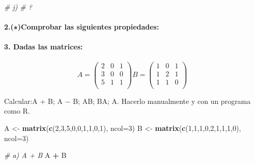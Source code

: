 \documentclass[]{article}
\newenvironment{Shaded}{\begin{snugshade}}{\end{snugshade}}
\newcommand{\CommentTok}[1]{\textcolor[rgb]{0.56,0.35,0.01}{\textit{#1}}}
\newcommand{\DataTypeTok}[1]{\textcolor[rgb]{0.13,0.29,0.53}{#1}}
\newcommand{\DecValTok}[1]{\textcolor[rgb]{0.00,0.00,0.81}{#1}}
\newcommand{\KeywordTok}[1]{\textcolor[rgb]{0.13,0.29,0.53}{\textbf{#1}}}
\newcommand{\NormalTok}[1]{#1}
\newcommand{\OperatorTok}[1]{\textcolor[rgb]{0.81,0.36,0.00}{\textbf{#1}}}
\newcommand{\StringTok}[1]{\textcolor[rgb]{0.31,0.60,0.02}{#1}}
\let\oldparagraph\paragraph
\renewcommand{\paragraph}[1]{\oldparagraph{#1}\mbox{}}
\begin{document}
\begin{Shaded}
\begin{Highlighting}[]
\CommentTok{# j)}
\CommentTok{# ?}
\end{Highlighting}
\end{Shaded}

\hypertarget{comprobar-las-siguientes-propiedades}{%
\paragraph{2.(∗)Comprobar las siguientes
propiedades:}\label{comprobar-las-siguientes-propiedades}}

\hypertarget{dadas-las-matrices}{%
\paragraph{3. Dadas las matrices:}\label{dadas-las-matrices}}

\[A = \begin{pmatrix}
2 & 0 & 1 \\
3 & 0 & 0 \\
5 & 1 & 1\\
\end{pmatrix}
B =  \begin{pmatrix}
1 & 0 & 1 \\
1 & 2 & 1 \\
1 & 1 & 0\\
\end{pmatrix}
\]

Calcular:A + B; A − B; AB; BA; A. Hacerlo manualmente y con un programa
como R.

\begin{Shaded}
\begin{Highlighting}[]
\NormalTok{A <-}\StringTok{ }\KeywordTok{matrix}\NormalTok{(}\KeywordTok{c}\NormalTok{(}\DecValTok{2}\NormalTok{,}\DecValTok{3}\NormalTok{,}\DecValTok{5}\NormalTok{,}\DecValTok{0}\NormalTok{,}\DecValTok{0}\NormalTok{,}\DecValTok{1}\NormalTok{,}\DecValTok{1}\NormalTok{,}\DecValTok{0}\NormalTok{,}\DecValTok{1}\NormalTok{), }\DataTypeTok{ncol=}\DecValTok{3}\NormalTok{)}
\NormalTok{B <-}\StringTok{ }\KeywordTok{matrix}\NormalTok{(}\KeywordTok{c}\NormalTok{(}\DecValTok{1}\NormalTok{,}\DecValTok{1}\NormalTok{,}\DecValTok{1}\NormalTok{,}\DecValTok{0}\NormalTok{,}\DecValTok{2}\NormalTok{,}\DecValTok{1}\NormalTok{,}\DecValTok{1}\NormalTok{,}\DecValTok{1}\NormalTok{,}\DecValTok{0}\NormalTok{), }\DataTypeTok{ncol=}\DecValTok{3}\NormalTok{)}

\CommentTok{# a) A + B}
\NormalTok{A }\OperatorTok{+}\StringTok{ }\NormalTok{B}
\end{Highlighting}
\end{Shaded}
\end{document}
